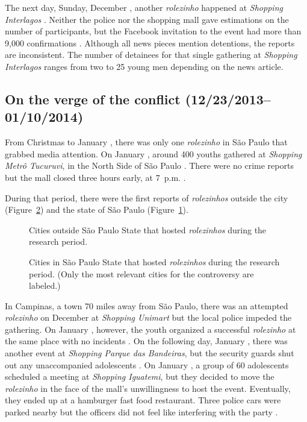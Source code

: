 The next day, Sunday, December , another \emph{rolezinho} happened at \emph{Shopping Interlagos} \autocite{folha_interlagos,g1_interlagos,ig_interlagos}. Neither the police nor the shopping mall gave estimations on the number of participants, but the Facebook invitation to the event had more than 9,000 confirmations \autocite{r7_interlagos}. Although all news pieces mention detentions, the reports are inconsistent. The number of detainees for that single gathering at \emph{Shopping Interlagos} ranges from two \autocite{r7_novas_invasoes} to 25 \autocite{estado_interlagos} young men depending on the news article.

\subsection*{On the verge of the conflict (12/23/2013--01/10/2014)}

From Christmas to January , there was only one \emph{rolezinho} in São Paulo that grabbed media attention. On January , around 400 youths gathered at \emph{Shopping Metrô Tucuruvi}, in the North Side of São Paulo \autocite{folha_tucuruvi_1,jovempan_tucuruvi,g1_tucuruvi}. There were no crime reports but the mall closed three hours early, at 7~p.m. \autocite{folha_tucuruvi_2,estado_tucuruvi}.

During that period, there were the first reports of \emph{rolezinhos} outside the city (Figure~\ref{citiesinsidesaopaulo}) and the state of São Paulo (Figure~\ref{citiesoutsidesaopaulo}).

\begin{figure}
\centering

\caption{Cities outside São Paulo State that hosted \emph{rolezinhos} during the research period.}
\label{citiesoutsidesaopaulo}
\end{figure}

\begin{figure}
\centering

\caption{Cities in São Paulo State that hosted \emph{rolezinhos} during the research period. (Only the most relevant cities for the controversy are labeled.)}
\label{citiesinsidesaopaulo}
\end{figure}

In Campinas, a town 70 miles away from São Paulo, there was an attempted \emph{rolezinho} on December  \autocite{cbn_campinas} at \emph{Shopping Unimart} but the local police impeded the gathering. On January , however, the youth organized a successful \emph{rolezinho} at the same place with no incidents \autocite{correio_popular_campinas_1}. On the following day, January , there was another event at \emph{Shopping Parque das Bandeiras}, but the security guards shut out any unaccompanied adolescents \autocite{g1_campinas}. On January , a group of 60 adolescents scheduled a meeting at \emph{Shopping Iguatemi}, but they decided to move the \emph{rolezinho} in the face of the mall's unwillingness to host the event. Eventually, they ended up at a hamburger fast food restaurant. Three police cars were parked nearby but the officers did not feel like interfering with the party \autocite{correio_popular_campinas_2}.

